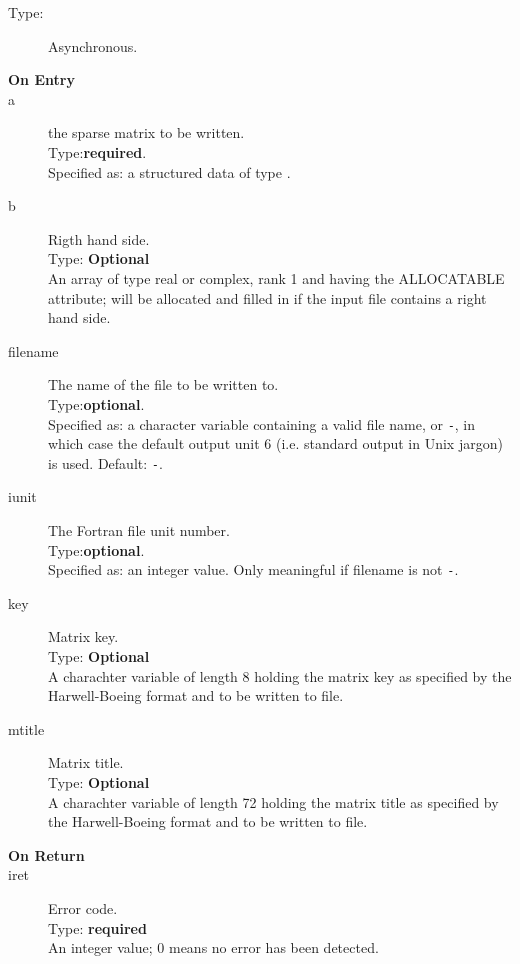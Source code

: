 \begin{description}
\item[Type:] Asynchronous.
\item[\bf  On Entry ]
\item[a] the sparse matrix to be written.\\
Type:{\bf required}.\\
Specified as: a structured data of type \spdata.
\item[b] Rigth hand side.\\
Type: {\bf Optional} \\
An  array of type real or complex, rank 1 and having the ALLOCATABLE
attribute; will be allocated and filled in if the input file contains
a right hand side. 
\item[filename] The name of the file to be written to.\\
Type:{\bf optional}.\\
Specified as: a character variable containing a valid file name, or
\verb|-|, in which case the default output unit  6 (i.e. standard output
in Unix jargon) is used. Default: \verb|-|. 
\item[iunit] The Fortran file unit number.\\
Type:{\bf optional}.\\
Specified as: an integer value. Only meaningful if filename is not \verb|-|.
\item[key] Matrix key.\\
Type: {\bf Optional} \\
A charachter variable of length 8 holding the
matrix key as specified by the Harwell-Boeing format and to be
written to file.
\item[mtitle] Matrix title.\\
Type: {\bf Optional} \\
A charachter variable of length 72 holding the
matrix title as specified by the Harwell-Boeing format and to be
written to file.
\end{description}

\begin{description}
\item[\bf On Return]
\item[iret] Error code.\\
Type: {\bf required} \\
An integer value; 0 means no error has been detected. 
\end{description}





